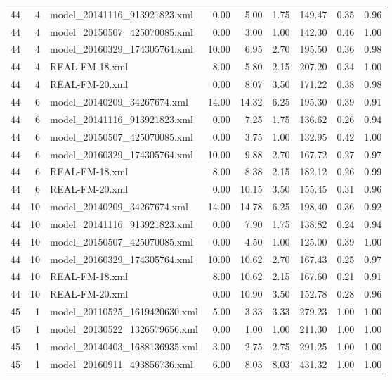 \begin{table}[ht]
\begin{tabular}{rrlrrrrrr}
   44 &   4 & model\_20141116\_913921823.xml & 0.00 & 5.00 & 1.75 & 149.47 & 0.35 & 0.96 \\ 
   44 &   4 & model\_20150507\_425070085.xml & 0.00 & 3.00 & 1.00 & 142.30 & 0.46 & 1.00 \\ 
   44 &   4 & model\_20160329\_174305764.xml & 10.00 & 6.95 & 2.70 & 195.50 & 0.36 & 0.98 \\ 
   44 &   4 & REAL-FM-18.xml & 8.00 & 5.80 & 2.15 & 207.20 & 0.34 & 1.00 \\ 
   44 &   4 & REAL-FM-20.xml & 0.00 & 8.07 & 3.50 & 171.22 & 0.38 & 0.98 \\ 
   44 &   6 & model\_20140209\_34267674.xml & 14.00 & 14.32 & 6.25 & 195.30 & 0.39 & 0.91 \\ 
   44 &   6 & model\_20141116\_913921823.xml & 0.00 & 7.25 & 1.75 & 136.62 & 0.26 & 0.94 \\ 
   44 &   6 & model\_20150507\_425070085.xml & 0.00 & 3.75 & 1.00 & 132.95 & 0.42 & 1.00 \\ 
   44 &   6 & model\_20160329\_174305764.xml & 10.00 & 9.88 & 2.70 & 167.72 & 0.27 & 0.97 \\ 
   44 &   6 & REAL-FM-18.xml & 8.00 & 8.38 & 2.15 & 182.12 & 0.26 & 0.99 \\ 
   44 &   6 & REAL-FM-20.xml & 0.00 & 10.15 & 3.50 & 155.45 & 0.31 & 0.96 \\ 
   44 &  10 & model\_20140209\_34267674.xml & 14.00 & 14.78 & 6.25 & 198.40 & 0.36 & 0.92 \\ 
   44 &  10 & model\_20141116\_913921823.xml & 0.00 & 7.90 & 1.75 & 138.82 & 0.24 & 0.94 \\ 
   44 &  10 & model\_20150507\_425070085.xml & 0.00 & 4.50 & 1.00 & 125.00 & 0.39 & 1.00 \\ 
   44 &  10 & model\_20160329\_174305764.xml & 10.00 & 10.62 & 2.70 & 167.43 & 0.25 & 0.97 \\ 
   44 &  10 & REAL-FM-18.xml & 8.00 & 10.62 & 2.15 & 167.60 & 0.21 & 0.91 \\ 
   44 &  10 & REAL-FM-20.xml & 0.00 & 10.90 & 3.50 & 152.78 & 0.28 & 0.96 \\ 
   45 &   1 & model\_20110525\_1619420630.xml & 5.00 & 3.33 & 3.33 & 279.23 & 1.00 & 1.00 \\ 
   45 &   1 & model\_20130522\_1326579656.xml & 0.00 & 1.00 & 1.00 & 211.30 & 1.00 & 1.00 \\ 
   45 &   1 & model\_20140403\_1688136935.xml & 3.00 & 2.75 & 2.75 & 291.25 & 1.00 & 1.00 \\ 
   45 &   1 & model\_20160911\_493856736.xml & 6.00 & 8.03 & 8.03 & 431.32 & 1.00 & 1.00 \\ 

\end{tabular}
\end{table}
